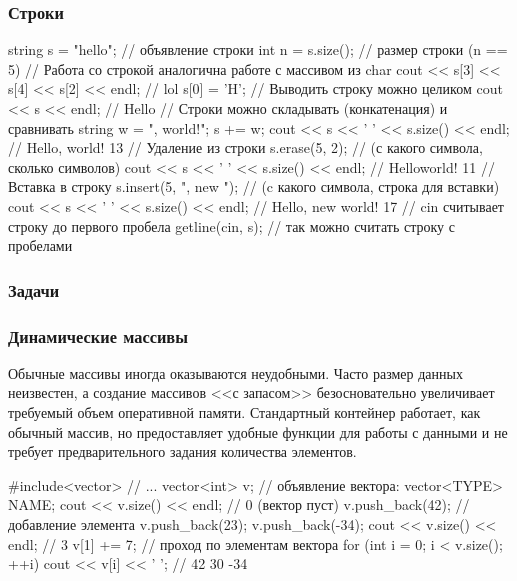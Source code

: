 \begin{frame}[fragile]
	\frametitle{Строки}
	\begin{code}
string s = "hello"; // объявление строки
int n = s.size(); // размер строки (n == 5)
// Работа со строкой аналогична работе с массивом из char
cout << s[3] << s[4] << s[2] << endl; // lol
s[0] = 'H';
// Выводить строку можно целиком
cout << s << endl; // Hello
// Строки можно складывать (конкатенация) и сравнивать
string w = ", world!"; s += w;
cout << s << ' ' << s.size() << endl; // Hello, world! 13
// Удаление из строки
s.erase(5, 2); // (с какого символа, сколько символов)
cout << s << ' ' << s.size() << endl; // Helloworld! 11
// Вставка в строку
s.insert(5, ", new "); // (c какого символа, строка для вставки)
cout << s << ' ' << s.size() << endl; // Hello, new world! 17
// cin считывает строку до первого пробела
getline(cin, s); // так можно считать строку с пробелами
	\end{code}
\end{frame}

\begin{frame}
	\frametitle{Задачи}
\end{frame}

\begin{frame}[fragile]
	\frametitle{Динамические массивы}
Обычные массивы иногда оказываются неудобными. Часто размер данных неизвестен, а
	создание массивов <<с запасом>> безосновательно увеличивает требуемый объем
	оперативной памяти. Стандартный контейнер  работает, как обычный
	массив, но предоставляет удобные функции для работы с данными и не требует
	предварительного задания количества элементов.
	\begin{code}
#include<vector>
// ...
vector<int> v; // объявление вектора: vector<TYPE> NAME;
cout << v.size() << endl; // 0 (вектор пуст)
v.push_back(42); // добавление элемента
v.push_back(23);
v.push_back(-34);
cout << v.size() << endl; // 3
v[1] += 7;
// проход по элементам вектора
for (int i = 0; i < v.size(); ++i)
	cout << v[i] << ' '; // 42 30 -34
	\end{code}
\end{frame}

